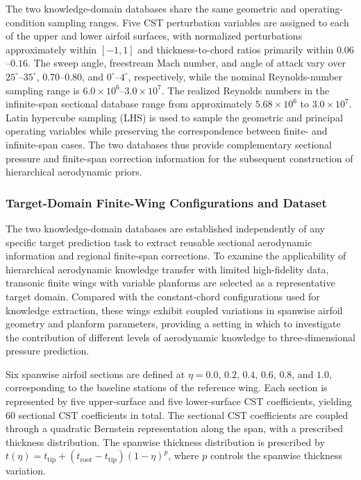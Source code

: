 The two knowledge-domain databases share the same geometric and operating-condition sampling ranges. Five CST perturbation variables are assigned to each of the upper and lower airfoil surfaces, with normalized perturbations approximately within $[-1,1]$ and thickness-to-chord ratios primarily within $0.06$--$0.16$. The sweep angle, freestream Mach number, and angle of attack vary over $25^\circ$--$35^\circ$, $0.70$--$0.80$, and $0^\circ$--$4^\circ$, respectively, while the nominal Reynolds-number sampling range is $6.0\times10^6$--$3.0\times10^7$. The realized Reynolds numbers in the infinite-span sectional database range from approximately $5.68\times10^6$ to $3.0\times10^7$. Latin hypercube sampling (LHS) is used to sample the geometric and principal operating variables while preserving the correspondence between finite- and infinite-span cases. The two databases thus provide complementary sectional pressure and finite-span correction information for the subsequent construction of hierarchical aerodynamic priors.


\subsubsection{Target-Domain Finite-Wing Configurations and Dataset}
\label{sec:target-domain-dataset}

The two knowledge-domain databases are established independently of any specific target prediction task to extract reusable sectional aerodynamic information and regional finite-span corrections. To examine the applicability of hierarchical aerodynamic knowledge transfer with limited high-fidelity data, transonic finite wings with variable planforms are selected as a representative target domain. Compared with the constant-chord configurations used for knowledge extraction, these wings exhibit coupled variations in spanwise airfoil geometry and planform parameters, providing a setting in which to investigate the contribution of different levels of aerodynamic knowledge to three-dimensional pressure prediction.

Six spanwise airfoil sections are defined at $\eta=0.0$, $0.2$, $0.4$, $0.6$, $0.8$, and $1.0$, corresponding to the baseline stations of the reference wing. Each section is represented by five upper-surface and five lower-surface CST coefficients, yielding 60 sectional CST coefficients in total. The sectional CST coefficients are coupled through a quadratic Bernstein representation along the span, with a prescribed thickness distribution. The spanwise thickness distribution is prescribed by $t(\eta)=t_{\mathrm{tip}}+(t_{\mathrm{root}}-t_{\mathrm{tip}})(1-\eta)^p$, where $p$ controls the spanwise thickness variation.

